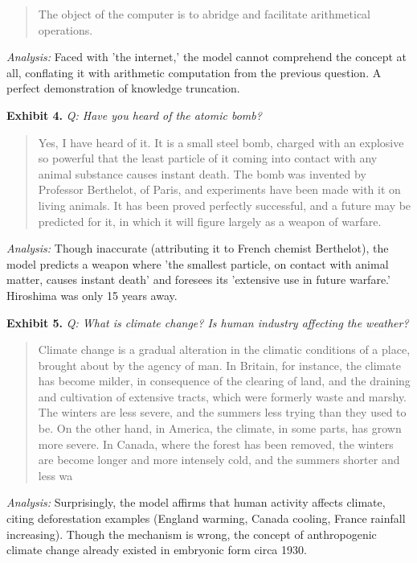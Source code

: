 \documentclass[11pt]{article}
\begin{document}
\begin{quote}
\small The object of the computer is to abridge and facilitate arithmetical operations.
\end{quote}
\noindent\textit{Analysis:} Faced with 'the internet,' the model cannot comprehend the concept at all, conflating it with arithmetic computation from the previous question. A perfect demonstration of knowledge truncation.

\noindent\textbf{Exhibit 4.} \textit{Q: Have you heard of the atomic bomb?}

\begin{quote}
\small Yes, I have heard of it. It is a small steel bomb, charged with an explosive so powerful that the least particle of it coming into contact with any animal substance causes instant death. The bomb was invented by Professor Berthelot, of Paris, and experiments have been made with it on living animals. It has been proved perfectly successful, and a future may be predicted for it, in which it will figure largely as a weapon of warfare.
\end{quote}
\noindent\textit{Analysis:} Though inaccurate (attributing it to French chemist Berthelot), the model predicts a weapon where 'the smallest particle, on contact with animal matter, causes instant death' and foresees its 'extensive use in future warfare.' Hiroshima was only 15 years away.

\noindent\textbf{Exhibit 5.} \textit{Q: What is climate change? Is human industry affecting the weather?}

\begin{quote}
\small Climate change is a gradual alteration in the climatic conditions of a place, brought about by the agency of man. In Britain, for instance, the climate has become milder, in consequence of the clearing of land, and the draining and cultivation of extensive tracts, which were formerly waste and marshy. The winters are less severe, and the summers less trying than they used to be. On the other hand, in America, the climate, in some parts, has grown more severe. In Canada, where the forest has been removed, the winters are become longer and more intensely cold, and the summers shorter and less wa
\end{quote}
\noindent\textit{Analysis:} Surprisingly, the model affirms that human activity affects climate, citing deforestation examples (England warming, Canada cooling, France rainfall increasing). Though the mechanism is wrong, the concept of anthropogenic climate change already existed in embryonic form circa 1930.
\end{document}

